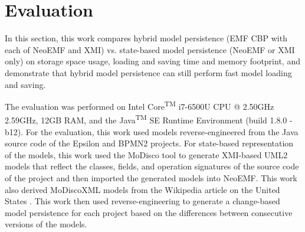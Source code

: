\section{Evaluation}
\label{sec:evaluation_5}
In this section, this work compares hybrid model persistence (EMF CBP with each of NeoEMF and XMI) vs. state-based model persistence (NeoEMF or XMI only) on storage space usage, loading and saving time and memory footprint, and demonstrate that hybrid model persistence can still perform fast model loading and saving. 

The evaluation was performed on Intel\textsuperscript{\textregistered} Core\textsuperscript{TM} i7-6500U CPU @ 2.50GHz 2.59GHz, 12GB RAM, and the Java\textsuperscript{TM} SE Runtime Environment (build 1.8.0 -b12). For the evaluation, this work used models reverse-engineered from the Java source code of the Epsilon \cite{eclipse2017epsilon,eclipse2018epsilongit} and BPMN2 \cite{eclipse2017bpmn2} projects. For state-based representation of the models, this work used the MoDisco tool \cite{DBLP:journals/infsof/BruneliereCDM14} to generate XMI-based UML2 \cite{eclipse2017uml2} models that reflect the classes, fields, and operation signatures of the source code of the project and then imported the generated models into NeoEMF. This work also derived MoDiscoXML models \cite{eclipse2018modiscoxml} from the Wikipedia article on the United States \cite{wikipedia2018us}. This work then used reverse-engineering to generate a change-based model persistence for each project based on the differences between consecutive versions of the models.

